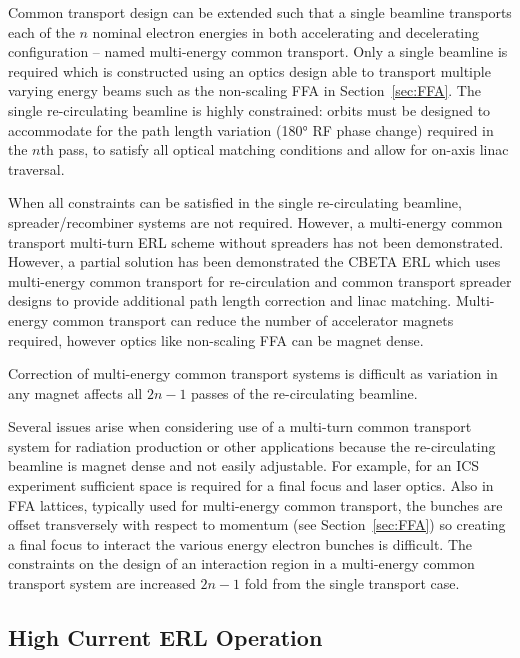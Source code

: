 \documentclass[../main.tex]{subfiles}
\begin{document}
Common transport design can be extended such that a single beamline transports each of the $n$ nominal electron energies in both accelerating and decelerating configuration -- named multi-energy common transport. Only a single beamline is required which is constructed using an optics design able to transport multiple varying energy beams such as the non-scaling FFA in Section~\ref{sec:FFA}. The single re-circulating beamline is highly constrained: orbits must be designed to accommodate for the path length variation (180\si{\degree} RF phase change) required in the $n$th pass, to satisfy all optical matching conditions and allow for on-axis linac traversal. 

When all constraints can be satisfied in the single re-circulating beamline, spreader/recombiner systems are not required. However, a multi-energy common transport multi-turn ERL scheme without spreaders has not been demonstrated. However, a partial solution has been demonstrated the CBETA ERL \cite{hoffstaetter2017cbeta,bartnik2020cbeta} which uses multi-energy common transport for re-circulation and common transport spreader designs to provide additional path length correction and linac matching. Multi-energy common transport can reduce the number of accelerator magnets required, however optics like non-scaling FFA can be magnet dense.

Correction of multi-energy common transport systems is difficult as variation in any magnet affects all $2n-1$ passes of the re-circulating beamline. 

Several issues arise when considering use of a multi-turn common transport system for radiation production or other applications because the re-circulating beamline is magnet dense and not easily adjustable. For example, for an ICS experiment sufficient space is required for a final focus and laser optics. Also in FFA lattices, typically used for multi-energy common transport, the bunches are offset transversely with respect to momentum (see Section~\ref{sec:FFA}) so creating a final focus to interact the various energy electron bunches is difficult. The constraints on the design of an interaction region in a multi-energy common transport system are increased $2n-1$ fold from the single transport case.   

\subsection{High Current ERL Operation}
\label{sec:high_current_ERL}
\end{document}
